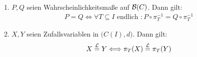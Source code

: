 \begin{satz}\label{satz7.5}\
	\begin{enumerate}[label=(\arabic*)]
		\item $P,Q$ seien Wahrscheinlichkeitsmaße auf $\mathcal{B}(C)$. Dann gilt:
		\begin{align*}
			P=Q\Longleftrightarrow\forall T\subseteq I\text{ endlich }: P\circ\pi_T^{-1}=Q\circ\pi_T^{-1}
		\end{align*}
		\item $X,Y$ seien Zufallsvariablen in $\big(C(I),d\big)$. Dann gilt:
		\begin{align*}
			X\stackrel{\mathcal{L}}{=}Y\Longleftrightarrow \pi_T(X)\stackrel{\mathcal{L}}{=}\pi_T(Y)
		\end{align*}
	\end{enumerate}
\end{satz}

